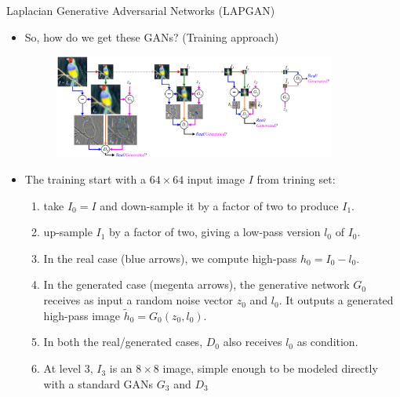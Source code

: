 \documentclass[10pt]{beamer}
\begin{document}
	\begin{frame}{Laplacian Generative Adversarial Networks (LAPGAN)}
		\begin{itemize}
			\item So, how do we get these GANs? (Training approach)
			\begin{figure}
				\includegraphics[width=25em]{figures/LAPGAN-general-structure.PNG}
			\end{figure}
			\item The training start with a $64\times64$ input image $I$ from trining set:
			\begin{enumerate}
				\item take $I_0=I$ and down-sample it by a factor of two to produce $I_1$.
				\item up-sample $I_1$ by a factor of two, giving a low-pass version $l_0$ of $I_0$.
				\item In the real case (blue arrows), we compute high-pass $h_0=I_0-l_0$.
				\item In the generated case (megenta arrows), the generative network $G_0$ receives as input a random noise vector $z_0$ and $l_0$. It outputs a generated high-pass image $\tilde{h}_0=G_0(z_0,l_0)$.
				\item In both the real/generated cases, $D_0$ also receives $l_0$ as condition.
				\item At level 3, $I_3$ is an $8\times8$ image, simple enough to be modeled directly with a standard GANs $G_3$ and $D_3$
			\end{enumerate}
		\end{itemize}
	\end{frame}
\end{document}
